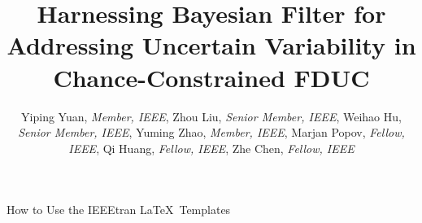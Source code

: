 \documentclass[lettersize,journal]{IEEEtran}
\begin{document}
\vspace{-2.5in}
\title{ \vspace{-0.5em}
	{\selectfont
		\fontsize{24}{20}\selectfont
		Harnessing Bayesian Filter for Addressing Uncertain Variability in Chance-Constrained FDUC
	}
}
\vspace{-2.5in}
\author{\fontsize{11}{8} \selectfont Yiping Yuan, \textit{Member, IEEE}, Zhou Liu, \textit{Senior Member, IEEE}, Weihao Hu, \textit{Senior Member, IEEE},   Yuming Zhao, \textit{Member, IEEE}, Marjan Popov, \textit{Fellow, IEEE}, Qi Huang,
	\textit{Fellow, IEEE}, Zhe Chen, \textit{Fellow, IEEE} \vspace{-2.5em}}

%
{How to Use the IEEEtran \LaTeX \ Templates}
\end{document}
